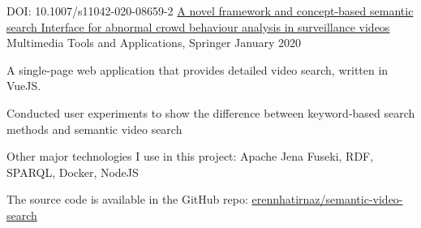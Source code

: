 
\begin{cventries}
  \cventry
    {DOI: 10.1007/s11042-020-08659-2} %
    {\href{https://doi.org/10.1007/s11042-020-08659-2}{A novel framework and concept-based semantic search Interface for abnormal crowd behaviour analysis in surveillance videos}} %
    {Multimedia Tools and Applications, Springer} %
    {January 2020} %
    {
      \begin{cvitems} %
        \item {A single-page web application that provides detailed video search, written in VueJS.}
		    \item {Conducted user experiments to show the difference between keyword-based search methods and semantic video search}
        \item {Other major technologies I use in this project: Apache Jena Fuseki, RDF, SPARQL, Docker, NodeJS}
        \item {The source code is available in the GitHub repo: \href{https://github.com/erenhatirnaz/semantic-video-search}{erennhatirnaz/semantic-video-search}}
      \end{cvitems}
    }

\end{cventries}

